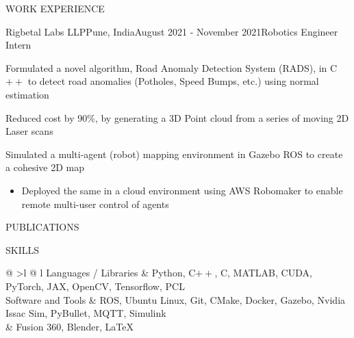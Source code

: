 \documentclass{resume} %
\begin{document}
\begin{rSection}{WORK EXPERIENCE}
	\begin{rProjExpDetails}{Rigbetal Labs LLP}{Pune, India}{August 2021 - November 2021}{Robotics Engineer Intern}{}{}
		\item Formulated a novel algorithm, Road Anomaly Detection System (RADS), in C$++$ to detect road anomalies (Potholes, Speed Bumps, etc.) using normal estimation
		\item Reduced cost by 90\%, by generating a 3D Point cloud from a series of moving 2D Laser scans
		\item Simulated a multi-agent (robot) mapping environment in Gazebo ROS to create a cohesive 2D map
		\begin{itemize}
			\item Deployed the same in a cloud environment using AWS Robomaker to enable remote multi-user control of agents
		\end{itemize}
	\end{rProjExpDetails}

\end{rSection}
\begin{rSection}{PUBLICATIONS}
	\nocite{*}
	\printbibliography[heading=none]
\end{rSection}
\begin{rSection}{SKILLS}
	\begin{tabular}{ @ {} >{\bfseries}l @{\hspace{3ex}} l }
		Languages / Libraries & Python, C$++$, C, MATLAB, CUDA, PyTorch, JAX, OpenCV, Tensorflow, PCL                     \\
		Software and Tools    & ROS, Ubuntu Linux, Git, CMake, Docker, Gazebo, Nvidia Issac Sim, PyBullet, MQTT, Simulink \\
		                      & Fusion 360, Blender, LaTeX                                                                \\
	\end{tabular}
\end{rSection}
\end{document}
